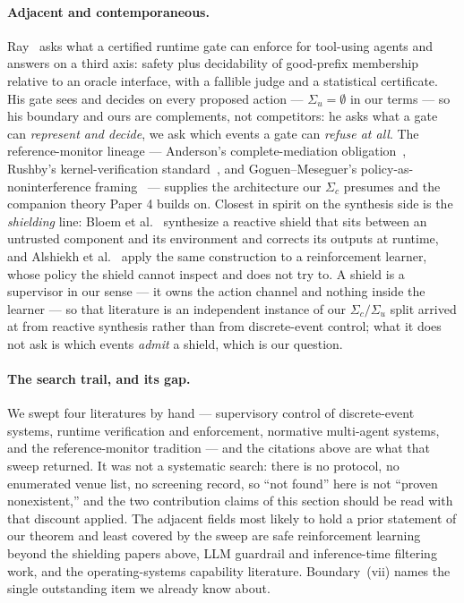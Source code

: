 \documentclass[11pt,a4paper]{article}  \usepackage{mdframed} \usepackage{graphicx}
\begin{document}
\paragraph{Adjacent and contemporaneous.} Ray~\cite{ray26} asks what a certified runtime gate can enforce for tool-using
agents and answers on a third axis: safety plus decidability of good-prefix membership relative to an oracle interface, with
a fallible judge and a statistical certificate. His gate sees and decides on every proposed action --- $\Sigma_u=\emptyset$
in our terms --- so his boundary and ours are complements, not competitors: he asks what a gate can \emph{represent and
decide}, we ask which events a gate can \emph{refuse at all}. The reference-monitor lineage --- Anderson's complete-mediation
obligation~\cite{anderson}, Rushby's kernel-verification standard~\cite{rushby}, and Goguen--Meseguer's
policy-as-noninterference framing~\cite{gm82} --- supplies the architecture our $\Sigma_c$ presumes and the companion theory
Paper 4 builds on. Closest in spirit on the synthesis side is the \emph{shielding} line: Bloem et al.~\cite{bkkw15}
synthesize a reactive shield that sits between an untrusted component and its environment and corrects its outputs at
runtime, and Alshiekh et al.~\cite{alshiekh18} apply the same construction to a reinforcement learner, whose policy the
shield cannot inspect and does not try to. A shield is a supervisor in our sense --- it owns the action channel and nothing
inside the learner --- so that literature is an independent instance of our $\Sigma_c/\Sigma_u$ split arrived at from
reactive synthesis rather than from discrete-event control; what it does not ask is which events \emph{admit} a shield, which
is our question.

\paragraph{The search trail, and its gap.} We swept four literatures by hand --- supervisory control of discrete-event
systems, runtime verification and enforcement, normative multi-agent systems, and the reference-monitor tradition --- and the
citations above are what that sweep returned. It was not a systematic search: there is no protocol, no enumerated venue list,
no screening record, so ``not found'' here is not ``proven nonexistent,'' and the two contribution claims of this section
should be read with that discount applied. The adjacent fields most likely to hold a prior statement of our theorem and least
covered by the sweep are safe reinforcement learning beyond the shielding papers above, LLM guardrail and inference-time
filtering work, and the operating-systems capability literature. Boundary~(vii) names the single outstanding item we already
know about.
\end{document}
